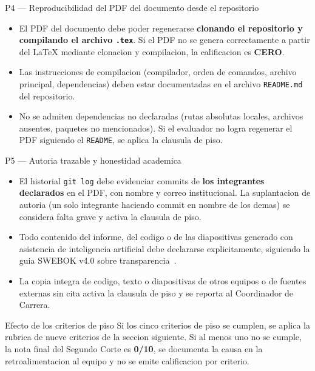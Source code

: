 \documentclass[11pt,a4paper]{article}
\begin{document}
\begin{cajacritica}{P4 --- Reproducibilidad del PDF del documento desde el repositorio}
	\begin{itemize}
		\item El PDF del documento debe poder regenerarse \textbf{clonando el repositorio y compilando el archivo \texttt{.tex}}. Si el PDF no se genera correctamente a partir del LaTeX mediante clonacion y compilacion, la calificacion es \textbf{CERO}.
		\item Las instrucciones de compilacion (compilador, orden de comandos, archivo principal, dependencias) deben estar documentadas en el archivo \texttt{README.md} del repositorio.
		\item No se admiten dependencias no declaradas (rutas absolutas locales, archivos ausentes, paquetes no mencionados). Si el evaluador no logra regenerar el PDF siguiendo el \texttt{README}, se aplica la clausula de piso.
	\end{itemize}
\end{cajacritica}

\begin{cajacritica}{P5 --- Autoria trazable y honestidad academica}
	\begin{itemize}
		\item El historial \texttt{git log} debe evidenciar commits de \textbf{los integrantes declarados} en el PDF, con nombre y correo institucional. La suplantacion de autoria (un solo integrante haciendo commit en nombre de los demas) se considera falta grave y activa la clausula de piso.
		\item Todo contenido del informe, del codigo o de las diapositivas generado con asistencia de inteligencia artificial debe declararse explicitamente, siguiendo la guia SWEBOK v4.0 sobre transparencia~\cite{washizaki2024swebok}.
		\item La copia integra de codigo, texto o diapositivas de otros equipos o de fuentes externas sin cita activa la clausula de piso y se reporta al Coordinador de Carrera.
	\end{itemize}
\end{cajacritica}

\begin{cajadefinicion}{Efecto de los criterios de piso}
	Si los cinco criterios de piso se cumplen, se aplica la rubrica de nueve criterios de la seccion siguiente. Si al menos uno no se cumple, la nota final del Segundo Corte es \textbf{0/10}, se documenta la causa en la retroalimentacion al equipo y no se emite calificacion por criterio.
\end{cajadefinicion}
\end{document}
